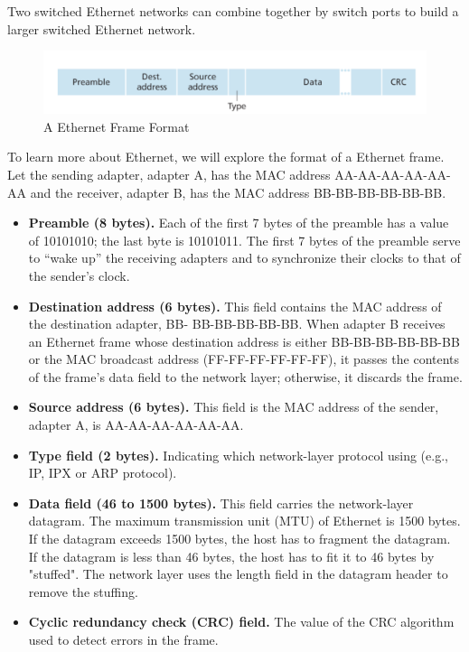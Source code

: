 \documentclass[a4paper, 11pt]{article}
\begin{document}
Two switched Ethernet networks can combine together by switch ports to build a larger switched Ethernet network.\\

\begin{figure}[h]
\includegraphics[scale=0.6]{ethernet-frame-format.png}
\caption{A Ethernet Frame Format}
\end{figure}

To learn more about Ethernet, we will explore the format of a Ethernet frame. Let the sending adapter, adapter A, has the MAC address AA-AA-AA-AA-AA-AA and the receiver, adapter B, has the MAC address BB-BB-BB-BB-BB-BB.\\

\begin{itemize}
\item \textbf{Preamble (8 bytes).} Each of the first 7 bytes of the preamble has a value of 10101010; the last byte is 10101011. The first 7 bytes of the
preamble serve to “wake up” the receiving adapters and to synchronize their clocks to that of the sender’s clock. 
\item \textbf{Destination address (6 bytes).} This field contains the MAC address of the destination adapter, BB- BB-BB-BB-BB-BB. When adapter B receives an Ethernet frame whose destination address is either
BB-BB-BB-BB-BB-BB or the MAC broadcast address (FF-FF-FF-FF-FF-FF), it passes the contents of the frame’s data field to the network layer; otherwise, it discards the frame.
\item \textbf{Source address (6 bytes).} This field is the MAC address of the sender, adapter A, is AA-AA-AA-AA-AA-AA.
\item \textbf{Type field (2 bytes).} Indicating which network-layer protocol using (e.g., IP, IPX or ARP protocol).
\item \textbf{Data field (46 to 1500 bytes).} This field carries the network-layer datagram. The maximum transmission unit (MTU) of Ethernet is 1500 bytes. If the datagram exceeds 1500 bytes, the host has to fragment the datagram. If the datagram is less than 46 bytes, the host has to fit it to 46 bytes by "stuffed". The network layer uses the length field in the datagram header to remove the stuffing.
\item \textbf{Cyclic redundancy check (CRC) field.} The value of the CRC algorithm used to detect errors in the frame.
\end{itemize}
\end{document}
